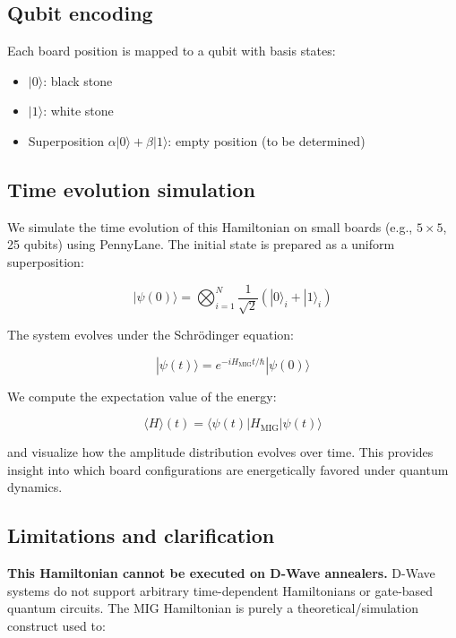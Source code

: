 \documentclass[aps,prl,reprint]{revtex4-2}
\begin{document}
\subsection{Qubit encoding}

Each board position is mapped to a qubit with basis states:
\begin{itemize}
	\item $|0\rangle$: black stone
	\item $|1\rangle$: white stone
	\item Superposition $\alpha|0\rangle + \beta|1\rangle$: empty position (to be determined)
\end{itemize}

\subsection{Time evolution simulation}

We simulate the time evolution of this Hamiltonian on small boards (e.g., $5 \times 5$, 25 qubits) using PennyLane. The initial state is prepared as a uniform superposition:

\begin{equation}
|\psi(0)\rangle = \bigotimes_{i=1}^{N} \frac{1}{\sqrt{2}}(|0\rangle_i + |1\rangle_i)
\end{equation}

The system evolves under the Schrödinger equation:

\begin{equation}
|\psi(t)\rangle = e^{-iH_{\text{MIG}}t/\hbar} |\psi(0)\rangle
\end{equation}

We compute the expectation value of the energy:

\begin{equation}
\langle H \rangle(t) = \langle \psi(t) | H_{\text{MIG}} | \psi(t) \rangle
\end{equation}

and visualize how the amplitude distribution evolves over time. This provides insight into which board configurations are energetically favored under quantum dynamics.

\subsection{Limitations and clarification}

\textbf{This Hamiltonian cannot be executed on D-Wave annealers.} D-Wave systems do not support arbitrary time-dependent Hamiltonians or gate-based quantum circuits. The MIG Hamiltonian is purely a theoretical/simulation construct used to:
\end{document}
